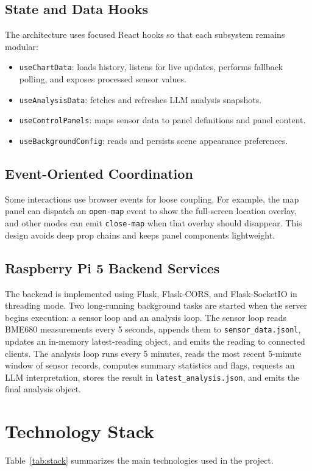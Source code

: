 \documentclass[conference]{IEEEtran}
\begin{document}
\subsection{State and Data Hooks}
The architecture uses focused React hooks so that each subsystem remains modular:
\begin{itemize}
\item \texttt{useChartData}: loads history, listens for live updates, performs fallback polling, and exposes processed sensor values.
\item \texttt{useAnalysisData}: fetches and refreshes LLM analysis snapshots.
\item \texttt{useControlPanels}: maps sensor data to panel definitions and panel content.
\item \texttt{useBackgroundConfig}: reads and persists scene appearance preferences.
\end{itemize}

\subsection{Event-Oriented Coordination}
Some interactions use browser events for loose coupling. For example, the map panel can dispatch an \texttt{open-map} event to show the full-screen location overlay, and other modes can emit \texttt{close-map} when that overlay should disappear. This design avoids deep prop chains and keeps panel components lightweight.

\subsection{Raspberry Pi 5 Backend Services}
The backend is implemented using Flask, Flask-CORS, and Flask-SocketIO in threading mode. Two long-running background tasks are started when the server begins execution: a sensor loop and an analysis loop. The sensor loop reads BME680 measurements every 5 seconds, appends them to \texttt{sensor\_data.jsonl}, updates an in-memory latest-reading object, and emits the reading to connected clients. The analysis loop runs every 5 minutes, reads the most recent 5-minute window of sensor records, computes summary statistics and flags, requests an LLM interpretation, stores the result in \texttt{latest\_analysis.json}, and emits the final analysis object.

\section{Technology Stack}
Table~\ref{tab:stack} summarizes the main technologies used in the project.
\end{document}
